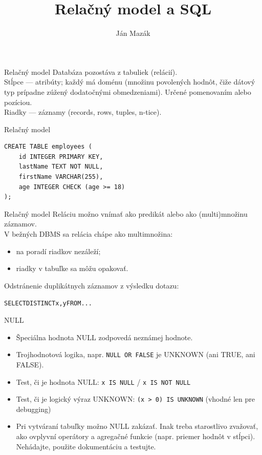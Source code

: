 \documentclass[12pt]{beamer}
\title{Relačný model a SQL}
\author{Ján Mazák}
\institute{FMFI UK Bratislava}
\date{}
\begin{document}
\frame{\titlepage}

\begin{frame}{Relačný model}
Databáza pozostáva z tabuliek (\alert{relácií}).\\[3mm]

Stĺpce --- \alert{atribúty}; každý má doménu (množinu povolených hodnôt, čiže dátový typ prípadne zúžený dodatočnými obmedzeniami). Určené pomenovaním alebo pozíciou.\\[3mm]

Riadky --- \alert{záznamy} (records, rows, tuples, n-tice).
\end{frame}

\begin{frame}[fragile]{Relačný model}
\begin{verbatim}
CREATE TABLE employees (
    id INTEGER PRIMARY KEY,
    lastName TEXT NOT NULL,
    firstName VARCHAR(255),
    age INTEGER CHECK (age >= 18)
);
\end{verbatim}
\end{frame}

\begin{frame}{Relačný model}
Reláciu možno vnímať ako predikát alebo ako (multi)množinu záznamov.\\[3mm]

V bežných DBMS sa relácia chápe ako multimnožina:
\begin{itemize}
\item na poradí riadkov nezáleží;
\item riadky v tabuľke sa môžu opakovať.
\end{itemize}

Odstránenie duplikátnych záznamov z výsledku dotazu:
\begin{alltt}
    SELECT \alert{DISTINCT} x, y FROM ...
\end{alltt}
\end{frame}

\begin{frame}[fragile]{NULL}
\begin{itemize}
\item Špeciálna hodnota \alert{NULL} zodpovedá neznámej hodnote.
\item Trojhodnotová logika, napr. \verb|NULL OR FALSE| je UNKNOWN (ani TRUE, ani FALSE).
\item Test, či je hodnota NULL: \verb|x IS NULL| / \verb|x IS NOT NULL|
\item Test, či je logický výraz UNKNOWN: \verb|(x > 0) IS UNKNOWN| (vhodné len pre debugging)
\item Pri vytváraní tabuľky možno NULL zakázať.
Inak treba starostlivo zvažovať, ako ovplyvní operátory a agregačné funkcie (napr. priemer hodnôt v stĺpci).
Nehádajte, použite dokumentáciu a testujte.
\end{itemize}
\end{frame}
\end{document}
